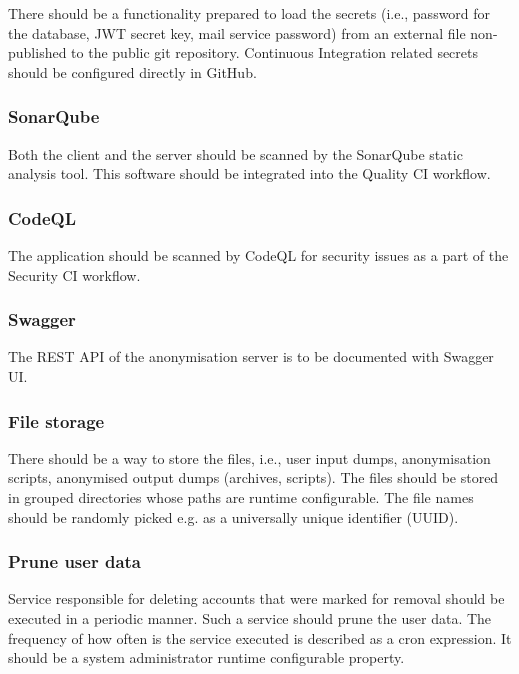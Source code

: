 \documentclass[a4paper,twoside,12pt]{book}
\begin{document}
There should be a functionality prepared to load the secrets (i.e., password for the database, JWT secret key, mail service password) from an external file non-published to the public git repository. Continuous Integration related secrets should be configured directly in GitHub.

\subsubsection{SonarQube}

Both the client and the server should be scanned by the SonarQube static analysis tool. This software should be integrated into the Quality CI workflow.

\subsubsection{CodeQL}

The application should be scanned by CodeQL for security issues as a part of the Security CI workflow.

\subsubsection{Swagger}

The REST API of the anonymisation server is to be documented with Swagger UI.

\subsubsection{File storage}

There should be a way to store the files, i.e., user input dumps, anonymisation scripts, anonymised output dumps (archives, scripts). The files should be stored in grouped directories whose paths are runtime configurable. The file names should be randomly picked e.g. as a universally unique identifier (UUID).

\subsubsection{Prune user data}

Service responsible for deleting accounts that were marked for removal should be executed in a periodic manner. Such a service should prune the user data. The frequency of how often is the service executed is described as a cron expression. It should be a system administrator runtime configurable property.
\end{document}
